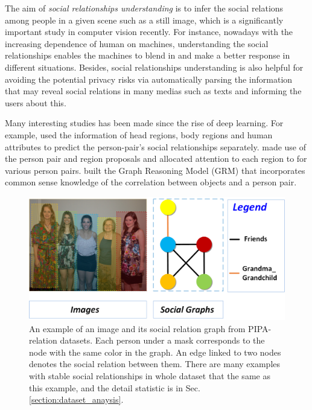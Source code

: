 \documentclass{article}
\begin{document}
The aim of \emph{social relationships understanding} is to infer the social relations among people in a given scene such as a still image, which is a significantly important study in computer vision recently. For instance, nowadays with the increasing dependence of human on machines, understanding the social relationships enables the machines to blend in and make a better response in different situations. Besides, social relationships understanding is also helpful for avoiding the potential privacy risks via automatically parsing the information that may reveal social relations in many medias such as texts \cite{article} and informing the users about this. 

Many interesting studies has been made since the rise of deep learning. For example, \cite{DBLP:conf/cvpr/SunSF17} used the information of head regions, body regions and human attributes to predict the person-pair's social relationships separately. \cite{DBLP:conf/iccv/LiWZK17} made use of the person pair and region proposals and allocated attention to each region to for various person pairs. \cite{DBLP:conf/ijcai/WangCRYCL18} built the Graph Reasoning Model (GRM) that incorporates common sense knowledge of the correlation between objects and a person pair.

\vspace*{-1mm}
\begin{figure}[htpb]
	\centering
	\includegraphics[width=0.48 \textwidth,clip]{./pic/example_1.png}
 \caption{An example of an image and its social relation graph from PIPA-relation datasets.
Each person under a mask corresponds to the node with the same color in the graph. An edge linked to two nodes denotes the social relation between them.
There are many examples with stable social relationships in whole dataset that the same as this example, and the detail statistic is in Sec. \ref{section:dataset_anaysis}.}
	\vspace*{-3.5mm}
	\label{fig:example}
\end{figure}
\end{document}
